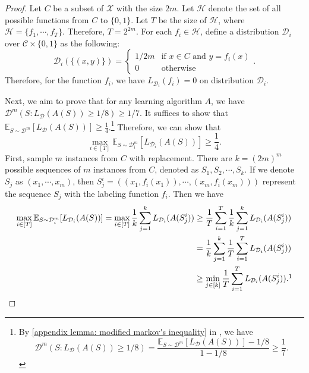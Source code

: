 \documentclass[openany, amssymb, psamsfonts]{amsart}
\theoremstyle{definition}
\numberwithin{equation}{section}
\begin{document}
\begin{proof}
Let $C$ be a subset of $\mathcal{X}$ with the size $2m$.
Let $\mathcal{H}$ denote the set of all possible functions from $C$ to $\{0,1\}$.
Let $T$ be the size of $\mathcal{H}$, where $\mathcal{H} = \{f_1, \cdots, f_T\}$. Therefore, $T = 2^{2m}$. For each $f_i \in \mathcal{H}$, define a distribution $\mathcal{D}_i$ over $\mathcal{C} \times \{0,1\}$ as the following:
\[
\mathcal{D}_i(\{(x,y)\}) = 
\begin{cases} 
1/2m & \text{if } x\in C \text{ and } y = f_i(x) \\
0 & \text{otherwise}
\end{cases}
.\]
Therefore, for the function $f_i$, we have $L_{\mathcal{D}_i}(f_i) = 0$ on distribution $\mathcal{D}_i$.

\noindent Next, we aim to prove that for any learning algorithm $A$, we have $\mathcal{D}^m(S \colon L_{\mathcal{D}}(A(S)) \geq 1/8) \geq 1/7$. It suffices to show that $\mathbb{E}_{S \sim \mathcal{D}^m} [L_{\mathcal{D}}(A(S))] \geq \frac{1}{4}$.\footnote{By \autoref{appendix lemma: modified markov's inequality} in , we have 
\[
\mathcal{D}^m(S \colon L_{\mathcal{D}}(A(S)) \geq 1/8) = \frac{\mathbb{E}_{S \sim \mathcal{D}^m} [L_{\mathcal{D}}(A(S))] - 1/8}{1 - 1/8} \geq \frac{1}{7}
.\]}
Therefore, we can show that
\[
\max_{i \in [T]} \mathbb{E}_{S \sim \mathcal{D}_i^m} [L_{\mathcal{D}_i}(A(S))] \geq \frac{1}{4}.
\]
First, sample $m$ instances from $C$ with replacement. There are $k = (2m)^m$ possible sequences of $m$ instances from $C$, denoted as $S_1, S_2, \cdots, S_k$. If we denote $S_j$ as $(x_1, \cdots, x_m)$, then $S_j^i = ((x_1, f_i(x_1)), \cdots, (x_m, f_i(x_m)))$ represent the sequence $S_j$ with the labeling function $f_i$. Then we have
\begin{align*}
\max_{i \in [T]} \mathbb{E}_{S \sim \mathcal{D}_i^m} [L_{\mathcal{D}_i}(A(S))] 
= \max_{i \in [T]} \frac{1}{k} \sum_{j=1}^k L_{\mathcal{D}_i}(A(S_j^i)) 
&\geq \frac{1}{T} \sum_{i=1}^T \frac{1}{k} \sum_{j=1}^k L_{\mathcal{D}_i}(A(S_j^i)) \\
&= \frac{1}{k} \sum_{j=1}^k \frac{1}{T} \sum_{i=1}^T L_{\mathcal{D}_i}(A(S_j^i)) \\
&\geq \min_{j \in [k]} \frac{1}{T} \sum_{i=1}^T L_{\mathcal{D}_i}(A(S_j^i)).\footnotemark
\end{align*}


\end{proof}
\end{document}
